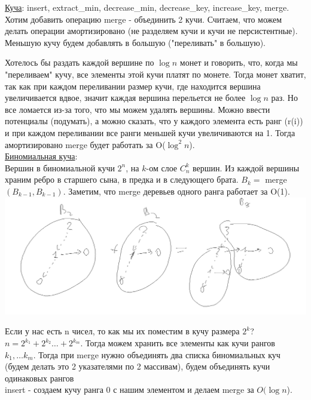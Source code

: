 \documentclass{article}
\newcommand{\tu}[1]{\underline{#1}}
\begin{document}
\tu{Куча}: insert, extract\_min, decrease\_min, decrease\_key, increase\_key, merge. Хотим добавить операцию merge - объединить 2 кучи. Считаем, что можем делать операции амортизировано (не разделяем кучи и кучи не персистентные). Меньшую кучу будем добавлять в большую ("переливать" в большую). 

Хотелось бы раздать каждой вершине по $\log n$ монет и говорить, что, когда мы "переливаем" кучу, все элементы этой кучи платят по монете. Тогда монет хватит, так как при каждом переливании размер кучи, где находится вершина увеличивается вдвое, значит каждая вершина перельется не более $\log n$ раз. Но все ломается из-за того, что мы можем удалять вершины. Можно ввести потенциалы (подумать), а можно сказать, что у каждого элемента есть ранг (r(i)) и при каждом переливании все ранги меньшей кучи увеличиваются на 1. Тогда амортизировано merge будет работать за O($\log^2 n$). \\

\tu{Биномиальная куча}: \\

Вершин в биномиальной кучи $2^n$, на $k$-ом слое $C_n^k$ вершин. Из каждой вершины храним ребро в старшего сына, в предка и в следующего брата. $B_k = $ merge$(B_{k-1}, B_{k-1})$. %
Заметим, что merge деревьев одного ранга работает за O(1). \\

\includegraphics[width=15cm]{../pictures/binominial_heap_add.png}


Если у нас есть n чисел, то как мы их поместим в кучу размера $2^k$? $n = 2^{k_1} + 2^{k_2} \dots + 2^{k_m}$. Тогда можем хранить все элементы как кучи рангов $k_1, \dots k_m$. Тогда при merge нужно объединять два списка биномиальных куч (будем делать это 2 указателями по 2 массивам), будем объединять кучи одинаковых рангов \\ %

insert - создаем кучу ранга 0 с нашим элементом и делаем merge за $O(\log n$).
\end{document}
